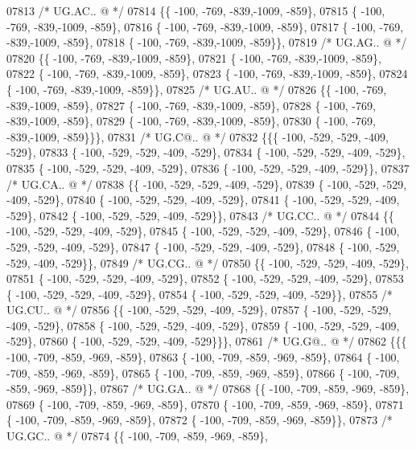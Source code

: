 \begin{DoxyCode}
07813 \textcolor{comment}{/* UG.AC.. @ */}
07814 \{\{ -100, -769, -839,-1009, -859\},
07815 \{ -100, -769, -839,-1009, -859\},
07816 \{ -100, -769, -839,-1009, -859\},
07817 \{ -100, -769, -839,-1009, -859\},
07818 \{ -100, -769, -839,-1009, -859\}\},
07819 \textcolor{comment}{/* UG.AG.. @ */}
07820 \{\{ -100, -769, -839,-1009, -859\},
07821 \{ -100, -769, -839,-1009, -859\},
07822 \{ -100, -769, -839,-1009, -859\},
07823 \{ -100, -769, -839,-1009, -859\},
07824 \{ -100, -769, -839,-1009, -859\}\},
07825 \textcolor{comment}{/* UG.AU.. @ */}
07826 \{\{ -100, -769, -839,-1009, -859\},
07827 \{ -100, -769, -839,-1009, -859\},
07828 \{ -100, -769, -839,-1009, -859\},
07829 \{ -100, -769, -839,-1009, -859\},
07830 \{ -100, -769, -839,-1009, -859\}\}\},
07831 \textcolor{comment}{/* UG.C@.. @ */}
07832 \{\{\{ -100, -529, -529, -409, -529\},
07833 \{ -100, -529, -529, -409, -529\},
07834 \{ -100, -529, -529, -409, -529\},
07835 \{ -100, -529, -529, -409, -529\},
07836 \{ -100, -529, -529, -409, -529\}\},
07837 \textcolor{comment}{/* UG.CA.. @ */}
07838 \{\{ -100, -529, -529, -409, -529\},
07839 \{ -100, -529, -529, -409, -529\},
07840 \{ -100, -529, -529, -409, -529\},
07841 \{ -100, -529, -529, -409, -529\},
07842 \{ -100, -529, -529, -409, -529\}\},
07843 \textcolor{comment}{/* UG.CC.. @ */}
07844 \{\{ -100, -529, -529, -409, -529\},
07845 \{ -100, -529, -529, -409, -529\},
07846 \{ -100, -529, -529, -409, -529\},
07847 \{ -100, -529, -529, -409, -529\},
07848 \{ -100, -529, -529, -409, -529\}\},
07849 \textcolor{comment}{/* UG.CG.. @ */}
07850 \{\{ -100, -529, -529, -409, -529\},
07851 \{ -100, -529, -529, -409, -529\},
07852 \{ -100, -529, -529, -409, -529\},
07853 \{ -100, -529, -529, -409, -529\},
07854 \{ -100, -529, -529, -409, -529\}\},
07855 \textcolor{comment}{/* UG.CU.. @ */}
07856 \{\{ -100, -529, -529, -409, -529\},
07857 \{ -100, -529, -529, -409, -529\},
07858 \{ -100, -529, -529, -409, -529\},
07859 \{ -100, -529, -529, -409, -529\},
07860 \{ -100, -529, -529, -409, -529\}\}\},
07861 \textcolor{comment}{/* UG.G@.. @ */}
07862 \{\{\{ -100, -709, -859, -969, -859\},
07863 \{ -100, -709, -859, -969, -859\},
07864 \{ -100, -709, -859, -969, -859\},
07865 \{ -100, -709, -859, -969, -859\},
07866 \{ -100, -709, -859, -969, -859\}\},
07867 \textcolor{comment}{/* UG.GA.. @ */}
07868 \{\{ -100, -709, -859, -969, -859\},
07869 \{ -100, -709, -859, -969, -859\},
07870 \{ -100, -709, -859, -969, -859\},
07871 \{ -100, -709, -859, -969, -859\},
07872 \{ -100, -709, -859, -969, -859\}\},
07873 \textcolor{comment}{/* UG.GC.. @ */}
07874 \{\{ -100, -709, -859, -969, -859\},

\end{DoxyCode}
